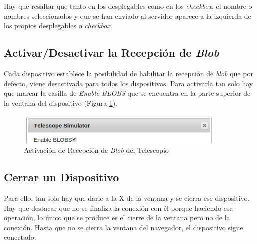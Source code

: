 Hay que resaltar que tanto en los desplegables como en los \textit{checkbox}, el nombre o nombres seleccionados y que se han enviado al servidor aparece a la izquierda de los propios desplegables o \textit{checkbox}.

\subsection{Activar/Desactivar la Recepción de \textit{Blob}}
Cada dispositivo establece la posibilidad de habilitar la recepción de \textit{blob} que por defecto, viene desactivada para todos los dispositivos. Para activarla tan solo hay que marcar la casilla de \textit{Enable BLOBS} que se encuentra en la parte superior de la ventana del dispositivo (Figura \ref{fig:activacionBlob}).
\begin{figure}[htb]
\centering
\includegraphics[width=0.9\textwidth]{./imagenes/activacionBlob}
\caption{Activación de Recepción de \textit{Blob} del Telescopio} \label{fig:activacionBlob}
\end{figure}

\subsection{Cerrar un Dispositivo}
Para ello, tan solo hay que darle a la X de la ventana y se cierra ese dispositivo. Hay que destacar que no se finaliza la conexión con él porque haciendo esa operación, lo único que se produce es el cierre de la ventana pero no de la conexión. Hasta que no se cierra la ventana del navegador, el dispositivo sigue conectado.
